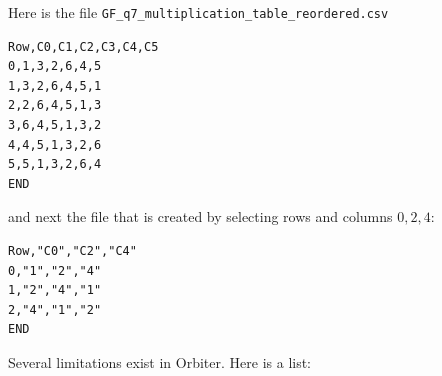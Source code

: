 Here is the file \verb'GF_q7_multiplication_table_reordered.csv'
\begin{mdframed}[style=MyFrame]
\begin{verbatim}
Row,C0,C1,C2,C3,C4,C5
0,1,3,2,6,4,5
1,3,2,6,4,5,1
2,2,6,4,5,1,3
3,6,4,5,1,3,2
4,4,5,1,3,2,6
5,5,1,3,2,6,4
END
\end{verbatim}
\end{mdframed}
and next the file that is created by selecting rows and columns $0,2,4$:
\begin{mdframed}[style=MyFrame]
\begin{verbatim}
Row,"C0","C2","C4"
0,"1","2","4"
1,"2","4","1"
2,"4","1","2"
END
\end{verbatim}
\end{mdframed}

Several limitations exist in Orbiter. Here is a list:

